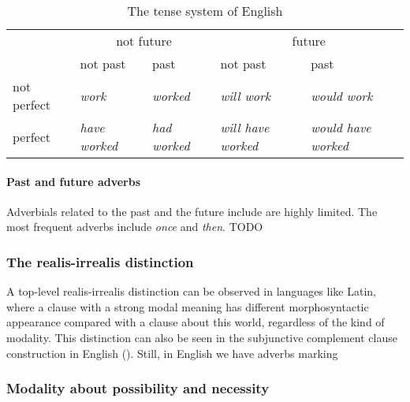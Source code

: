 \documentclass[UTF8, a4paper, oneside, scheme=plain, 12pt]{ctexbook}
\newcommand{\form}[1]{\emph{#1}}
\begin{document}
\begin{table}[H]
    \caption{The tense system of English}
    \label{tbl:tense}
    \centering
    \begin{tabular}{@{}lllll@{}}
        \toprule
                    & \multicolumn{2}{c}{not future}             & \multicolumn{2}{c}{future}                             \\ \cmidrule(lr){2-3} \cmidrule(l){4-5}
                    & not past             & past                & not past                  & past                       \\ \midrule
        not perfect & \form{work}        & \form{worked}     & \form{will work}        & \form{would work}        \\
        perfect     & \form{have worked} & \form{had worked} & \form{will have worked} & \form{would have worked} \\ \bottomrule
    \end{tabular}
\end{table}

\paragraph{Past and future adverbs} 
Adverbials related to the past and the future include are highly limited.
The most frequent adverbs include \form{once} and \form{then}. TODO 

\subsubsection{The realis-irrealis distinction}

A top-level realis-irrealis distinction can be observed in languages like Latin,
where a clause with a strong modal meaning has different morphosyntactic appearance
compared with a clause about this world,
regardless of the kind of modality.
This distinction can also be seen in the 
subjunctive complement clause construction in English
().
Still, in English we have adverbs marking 

\begin{exe}
    \ex 
\end{exe}

\subsubsection{Modality about possibility and necessity}\label{sec:vp.tam.alethic}
\end{document}
